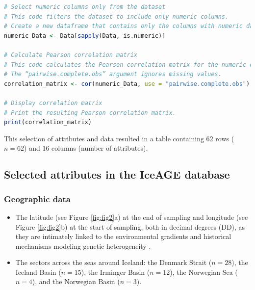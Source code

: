 {\begin{lstlisting}[label=lst:pearson,language=R,caption=RStudio script to calculate the Pearson correlation coefficient between all the numerical attributes in our final dataset]
# Select numeric columns only from the dataset
# This code filters the dataset to include only numeric columns.
# Create a new dataframe that contains only the columns with numeric data.
numeric_Data <- Data[sapply(Data, is.numeric)]

# Calculate Pearson correlation matrix
# This code calculates the Pearson correlation matrix for the numeric columns.
# The “pairwise.complete.obs” argument ignores missing values.
correlation_matrix <- cor(numeric_Data, use = "pairwise.complete.obs")

# Display correlation matrix
# Print the resulting Pearson correlation matrix.
print(correlation_matrix)
\end{lstlisting}

This selection of attributes and data resulted in a table containing 62 rows ($n=62$) and 16 columns (number of attributes). 

\subsection{Selected attributes in the IceAGE database}

\subsubsection{Geographic data} 

\begin{itemize}
\item The latitude (see Figure \ref{fig:fig2}a) at the end of sampling and longitude (see Figure \ref{fig:fig2}b) at the start of sampling, both in decimal degrees (DD), as they are intimately linked to the environmental gradients and historical mechanisms modeling genetic heterogeneity \citep{gaither2013origins}.
\item The sectors across the seas around Iceland: the Denmark Strait ($n=28$), the Iceland Basin ($n=15$), the Irminger Basin ($n=12$), the Norwegian Sea ($n=4$), and the Norwegian Basin ($n=3$). 
\end{itemize}

}
